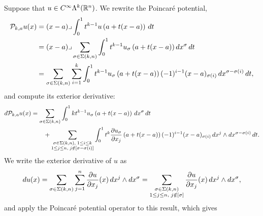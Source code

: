 \documentclass[10pt,a4paper]{article}
\begin{document}
Suppose that $u \in C^{\infty}\Lambda^{k}({\mathbb R}^n)$.
We rewrite the Poincar\'e potential,
\begin{align*}
    {\mathcal P}_{k,a} u(x) 
    &= 
    (x-a)\lrcorner \int_{0}^{1} t^{k-1} u\left(a+t(x-a)\right)\,dt 
    \\&
    = 
    (x-a)\lrcorner 
    \sum_{\sigma \in \Sigma(k,n)}
    \int_{0}^{1} 
    t^{k-1} u_{\sigma}\left(a+t(x-a)\right) dx^{\sigma} \,dt 
    \\&
    = 
    \sum_{\sigma \in \Sigma(k,n)} \sum_{i=1}^{k}
    \int_{0}^{1} 
    t^{k-1} u_{\sigma}\left(a+t(x-a)\right) (-1)^{i-1} (x-a)_{\sigma(i) } \,dx^{\sigma-\sigma(i)} \,dt 
    ,
\end{align*}
and compute its exterior derivative:
\begin{align*}
    d {\mathcal P}_{k,a} u(x) 
    &= 
    \sum_{\sigma \in \Sigma(k,n)} 
    \int_{0}^{1} 
    k t^{k-1} u_{\sigma}\left(a+t(x-a)\right) \,dx^{\sigma} \,dt 
    \\&\qquad
    + 
    \sum_{\substack{ \sigma \in \Sigma(k,n), \; 1 \leq i \leq k \\ 1 \leq j \leq n, \; j \notin [\sigma-\sigma(i)] }}
    \int_{0}^{1} 
    t^{k} \frac{ \partial u_{\sigma} }{\partial x_{j}}\left(a+t(x-a)\right) (-1)^{i-1} (x-a)_{\sigma(i) } \,dx^{j} \wedge dx^{\sigma-\sigma(i)} \,dt 
    .
\end{align*}
We write the exterior derivative of $u$ as 
\begin{align}\label{math:exteriorderivative_of_u_in_hodgediscussion}
    d u(x)
    =
    \sum_{\sigma \in \Sigma(k,n)} \sum_{j=1}^{n}
    \frac{ \partial u }{\partial x_{j}}(x) \,dx^{j} \wedge dx^{\sigma} 
    =
    \sum_{\substack{ \sigma \in \Sigma(k,n) \\ 1 \leq j \leq n, \; j \notin [\sigma] }}
    \frac{ \partial u }{\partial x_{j}}(x) \,dx^{j} \wedge dx^{\sigma} 
    ,
\end{align}
and apply the Poincar\'e potential operator to this result, which gives 
\end{document}
